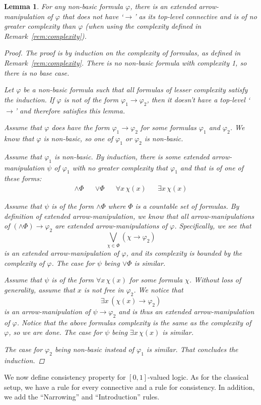 \documentclass{amsart}
\newtheorem{lemma}[theorem]{Lemma}
\theoremstyle{definition}
\numberwithin{equation}{theorem}
\renewcommand{\phi}{\varphi}
\newcommand{\unvee}{{\vee}}
\newcommand{\unwedge}{{\wedge}}
\newcommand{\narrow}[1]{\xrightarrow{#1}}
\renewcommand{\to}{\narrow{}}
\begin{document}
\begin{lemma}\label{lem:extended-arrow-manipulations}
  For any non-basic formula $\phi$, there is an extended arrow-manipulation of $\phi$ that does not have `$\to$' as its top-level connective and is of no greater complexity than $\phi$ (when using the complexity defined in Remark~\ref{rem:complexity}).
  \begin{proof}
    The proof is by induction on the complexity of formulas, as defined in Remark~\ref{rem:complexity}.
    There is no non-basic formula with complexity 1, so there is no base case.
    
    Let $\phi$ be a non-basic formula such that all formulas of lesser complexity satisfy the induction.
    If $\phi$ is not of the form $\phi_1\to\phi_2$, then it doesn't have a top-level `$\to$' and therefore satisfies this lemma.
    
    Assume that $\phi$ does have the form $\phi_1\to\phi_2$ for some formulas $\phi_1$ and $\phi_2$.
    We know that $\phi$ is non-basic, so one of $\phi_1$ or $\phi_2$ is non-basic.
    
    Assume that $\phi_1$ is non-basic.
    By induction, there is some extended arrow-manipulation $\psi$ of $\phi_1$ with no greater complexity that $\phi_1$ and that is of one of these forms:
    \begin{align*}
      \unwedge\Phi &&
      \unvee\Phi &&
      \forall x\,\chi(x) &&
      \exists x\,\chi(x) 
    \end{align*}
    
    Assume that $\psi$ is of the form $\unwedge\Phi$ where $\Phi$ is a countable set of formulas.
    By definition of extended arrow-manipulation, we know that all arrow-manipulations of $(\unwedge\Phi)\to\phi_2$ are extended arrow-manipulations of $\phi$.
    Specifically, we see that
    \[
      \bigvee_{\chi\in\Phi}(\chi\to\phi_2)
    \]
    is an extended arrow-manipulation of $\phi$, and its complexity is bounded by the complexity of $\phi$.
    The case for $\psi$ being $\unvee\Phi$ is similar.
    
    Assume that $\psi$ is of the form $\forall x\,\chi(x)$ for some formula $\chi$.
    Without loss of generality, assume that $x$ is not free in $\phi_2$.
    We notice that
    \[
      \exists x\,(\chi(x)\to\phi_2)
    \]
    is an arrow-manipulation of $\psi\to\phi_2$ and is thus an extended arrow-manipulation of $\phi$.
    Notice that the above formulas complexity is the same as the complexity of $\phi$, so we are done.
    The case for $\psi$ being $\exists x\,\chi(x)$ is similar.
    
    The case for $\phi_2$ being non-basic instead of $\phi_1$ is similar.
    That concludes the induction.
  \end{proof}
\end{lemma}
We now define consistency property for $[0,1]$-valued logic.
As for the classical setup, we have a rule for every connective and a rule for consistency.
In addition, we add the ``Narrowing'' and ``Introduction'' rules.
\end{document}
